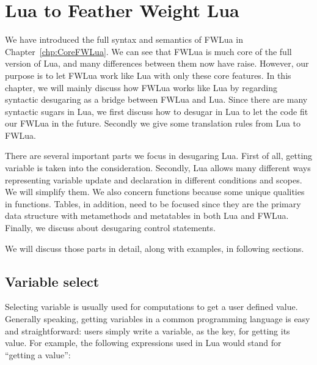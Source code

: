 \newcommand{\desugar}[2]{{#1} & \xlongequal[]{def} & {\begin{array}{@{}l@{}} #2 \end{array}}\\}
\newcommand{\desugarline}[1]{ & & {\begin{array}{@{}l@{}} #1 \end{array}}\\}

\newcommand{\translate}[2]{\llbracket {#1} \rrbracket & \xlongequal[]{} & {\begin{array}{@{}l@{}} #2 \end{array}}\\}
\newcommand{\translateline}[1]{ &  & {\begin{array}{@{}l@{}} #1 \end{array}}\\}

\chapter{Lua to Feather Weight Lua}
\label{chp:luaTranslation}

We have introduced the full syntax and semantics of FWLua in Chapter~\ref{chp:CoreFWLua}. We can see that FWLua is much core of the full version of Lua, and many differences between them now have raise.
However, our purpose is to let FWLua work like Lua with only these core features.
In this chapter, we will mainly discuss how FWLua works like Lua by regarding syntactic desugaring as a bridge between FWLua and Lua. Since there are many syntactic sugars in Lua, we first discuss how to desugar in Lua to let the code fit our FWLua in the future. Secondly we give some translation rules from Lua to FWLua.

There are several important parts we focus in desugaring Lua. First of all, getting variable is taken into the consideration. Secondly, Lua allows many different ways representing variable update and declaration in different conditions and scopes. We will simplify them. We also concern functions because some unique qualities in functions. Tables, in addition, need to be focused since they are the primary data structure with metamethods and metatables in both Lua and FWLua. Finally, we discuss about desugaring control statements. 

We will discuss those parts in detail, along with examples, in following sections.


\section{Variable select}
Selecting variable is usually used for computations to get a user defined value. Generally speaking, getting variables in a common programming language is easy and straightforward: users simply write a variable, as the key, for getting its value. For example, the following expressions used in Lua would stand for ``getting a value'':

